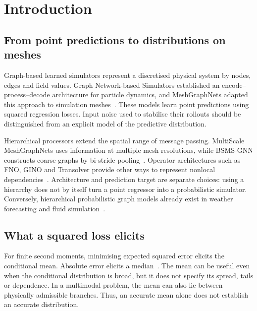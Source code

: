 ﻿%

\section{Introduction}
\label{sec:intro}

\subsection{From point predictions to distributions on meshes}
\label{sec:intro:lineage}

Graph-based learned simulators represent a discretised physical system by
nodes, edges and field values. Graph Network-based Simulators established an
encode--process--decode architecture for particle dynamics, and MeshGraphNets
adapted this approach to simulation meshes~\cite{sanchezgonzalez2020gns,
pfaff2021meshgraphnets}. These models learn point predictions using squared
regression losses. Input noise used to stabilise their rollouts should be
distinguished from an explicit model of the predictive distribution.

Hierarchical processors extend the spatial range of message passing.
MultiScale MeshGraphNets uses information at multiple mesh resolutions, while
BSMS-GNN constructs coarse graphs by bi-stride
pooling~\cite{fortunato2022msmgn,cao2023bsmsgnn}. Operator architectures such
as FNO, GINO and Transolver provide other ways to represent nonlocal
dependencies~\cite{li2021fourier,li2023gino,wu2024transolver}. Architecture
and prediction target are separate choices: using a hierarchy does not by
itself turn a point regressor into a probabilistic simulator. Conversely,
hierarchical probabilistic graph models already exist in weather forecasting
and fluid simulation~\cite{oskarsson2024graphefm,
lino2025diffusiongraphnets,lino2026scaleautoregressive}.

\subsection{What a squared loss elicits}
\label{sec:intro:elicitation}

For finite second moments, minimising expected squared error elicits the
conditional mean. Absolute error elicits a median~\cite{gneiting2007strictly}.
The mean can be useful even when the conditional distribution is broad, but it
does not specify its spread, tails or dependence. In a multimodal problem,
the mean can also lie between physically admissible branches. Thus, an
accurate mean alone does not establish an accurate distribution.

